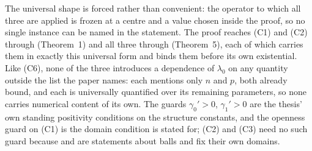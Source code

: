 \begin{theorem}[Theorem 6]
The universal shape is forced rather than convenient: the operator to which all
three are applied is frozen at a centre and a value chosen inside the proof, so
no single instance can be named in the statement.  The proof reaches (C1) and
(C2) through  (Theorem~1) and all three through
 (Theorem~5), each of which carries them in
exactly this universal form and binds them before its own existential.  Like
(C6), none of the three introduces a dependence of $\lambda_0$ on any quantity
outside the list the paper names: each mentions only $n$ and $p$, both already
bound, and each is universally quantified over its remaining parameters, so none
carries numerical content of its own.  The guards $\gamma_0'>0$, $\gamma_1'>0$
are the thesis' own standing positivity conditions on the structure constants,
and the openness guard on (C1) is the domain condition
 is stated for; (C2) and (C3) need no such guard
because  and  are
statements about balls and fix their own domains.
\end{theorem}
